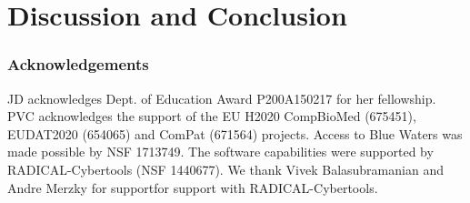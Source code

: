 \documentclass[conference]{IEEEtran}
\begin{document}
\section{Discussion and Conclusion}\label{sec:discussion}


\subsubsection*{Acknowledgements}
%

{\footnotesize JD acknowledges Dept. of Education Award P200A150217 for her
fellowship. PVC acknowledges the support of the EU H2020 CompBioMed (675451),
EUDAT2020 (654065) and ComPat (671564) projects. Access to Blue Waters was
made possible by NSF 1713749. The software capabilities were supported by
RADICAL-Cybertools (NSF 1440677). We thank Vivek Balasubramanian and Andre
Merzky for supportfor support with RADICAL-Cybertools.}
\newpage



\end{document}
